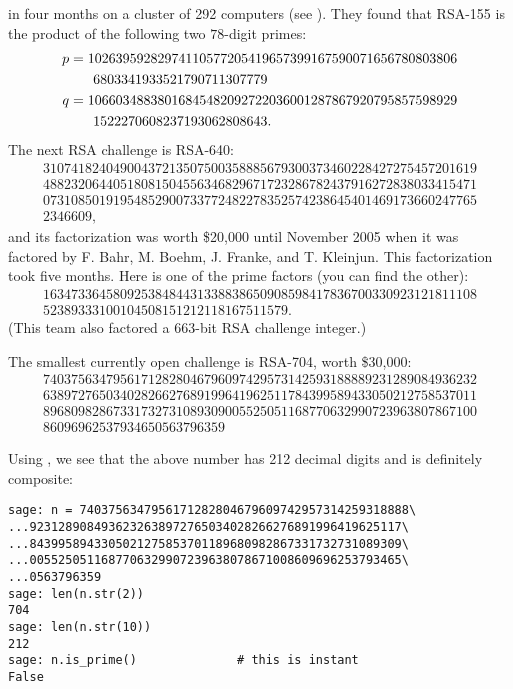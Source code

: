in four months on a cluster of 292 computers (see \cite{rsa155}).
They found that RSA-155 is the product of the following two
$78$-digit primes:
\begin{align*}
p &= 10263959282974110577205419657399167590071656780803806\\
  &\hspace{4ex} 6803341933521790711307779\\
q &= 10660348838016845482092722036001287867920795857598929\\
  &\hspace{4ex} 1522270608237193062808643.
\end{align*}
The next RSA challenge is RSA-640:
$$
\begin{array}{l}
31074182404900437213507500358885679300373460228427275457201619\\
48823206440518081504556346829671723286782437916272838033415471\\
07310850191954852900733772482278352574238645401469173660247765\\
2346609,
\end{array}
$$
and its factorization was worth \$20,000 until
November 2005 when it was factored by F. Bahr, M. Boehm, J. Franke,
and T. Kleinjun.  This factorization took five months.  Here is
one of the prime factors (you can find the other):
$$
\begin{array}{l}
16347336458092538484431338838650908598417836700330923121811108\\
52389333100104508151212118167511579.
\end{array}
$$
(This team also factored a 663-bit RSA challenge integer.)

The smallest currently open challenge is RSA-704, worth \$30,000:
$$
\begin{array}{l}
74037563479561712828046796097429573142593188889231289084936232\\
63897276503402826627689199641962511784399589433050212758537011\\
89680982867331732731089309005525051168770632990723963807867100\\
86096962537934650563796359
\end{array}
$$
\begin{sg}
Using \sage, we see that the above number has 212 decimal digits
and is definitely composite:
\begin{verbatim}
sage: n = 7403756347956171282804679609742957314259318888\
...9231289084936232638972765034028266276891996419625117\
...8439958943305021275853701189680982867331732731089309\
...0055250511687706329907239638078671008609696253793465\
...0563796359
sage: len(n.str(2))
704
sage: len(n.str(10))
212
sage: n.is_prime()              # this is instant
False
\end{verbatim}
\end{sg}

